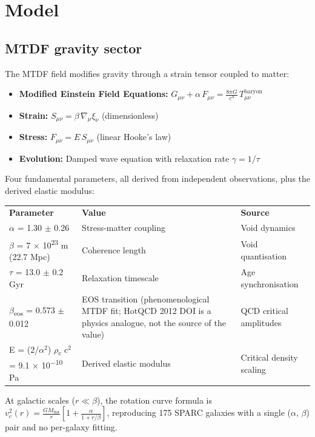 \documentclass[11pt,a4paper]{article}
\begin{document}
\section{Model}
\label{sec:model}

\subsection{MTDF gravity sector}
The MTDF field modifies gravity through a strain tensor coupled to matter:

\begin{itemize}
  \item \textbf{Modified Einstein Field Equations:} \(G_{\mu\nu} + \alpha\,F_{\mu\nu} = \frac{8\pi G}{c^4}\,T_{\mu\nu}^{\mathrm{baryon}}\)
  \item \textbf{Strain:} \(S_{\mu\nu} = \beta\,\nabla_\mu\xi_\nu\) (dimensionless)
  \item \textbf{Stress:} \(F_{\mu\nu} = E\,S_{\mu\nu}\) (linear Hooke's law)
  \item \textbf{Evolution:} Damped wave equation with relaxation rate \(\gamma = 1/\tau\)
\end{itemize}

Four fundamental parameters, all derived from independent observations, plus the derived elastic modulus:

\begin{table}[H]
\centering
\footnotesize
\begin{tabularx}{\linewidth}{l>{\RaggedRight\arraybackslash}X>{\RaggedRight\arraybackslash}X}
\toprule
\textbf{Parameter} & \textbf{Value} & \textbf{Source} \tabularnewline
$\alpha$ = 1.30 $\pm$ 0.26 & Stress-matter coupling & Void dynamics \tabularnewline
$\beta$ = 7 $\times$ 10\textsuperscript{23} m (22.7 Mpc) & Coherence length & Void quantisation \tabularnewline
$\tau$ = 13.0 $\pm$ 0.2 Gyr & Relaxation timescale & Age synchronisation \tabularnewline
$\beta$\textsubscript{eos} = 0.573 $\pm$ 0.012 & EOS transition (phenomenological MTDF fit; HotQCD 2012 DOI is a physics analogue, not the source of the value) & QCD critical amplitudes \tabularnewline
E = (2/\allowbreak{}$\alpha$$^{2}$) $\rho$\textsubscript{c} c$^{2}$ = 9.1 $\times$ 10\textsuperscript{$-$10} Pa & Derived elastic modulus & Critical density scaling \tabularnewline
\bottomrule
\end{tabularx}
\end{table}

At galactic scales (\(r \ll \beta\)), the rotation curve formula is \(v_c^2(r) = \frac{GM_{\mathrm{bar}}}{r}\left[1 + \frac{\alpha}{1 + r/\beta}\right]\), reproducing 175 SPARC galaxies with a single ($\alpha$, $\beta$) pair and no per-galaxy fitting.
\end{document}

